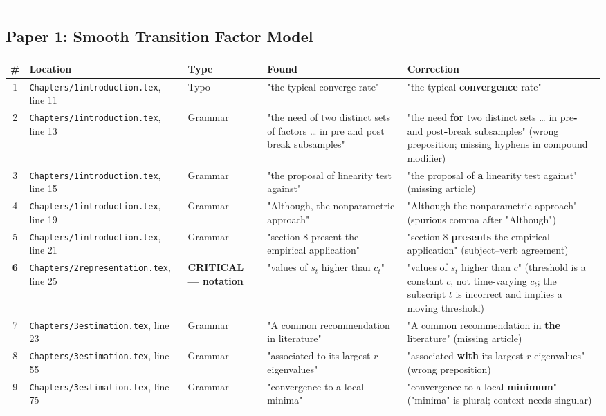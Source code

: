 \documentclass[11pt,a4paper]{article}
\begin{document}
\medskip\hrule\medskip

\subsection*{Paper 1: Smooth Transition Factor Model}

\begin{longtable}{c p{3.2cm} l p{3.8cm} p{3.5cm}}
\toprule
\textbf{\#} & \textbf{Location} & \textbf{Type} & \textbf{Found} & \textbf{Correction} \\
\midrule
\endhead
1 & \texttt{Chapters/1introduction.tex}, line 11 & Typo & "the typical converge rate" & "the typical \textbf{convergence} rate" \\
2 & \texttt{Chapters/1introduction.tex}, line 13 & Grammar & "the need of two distinct sets of factors … in pre and post break subsamples" & "the need \textbf{for} two distinct sets … in pre\textbf{-} and post\textbf{-}break subsamples" (wrong preposition; missing hyphens in compound modifier) \\
3 & \texttt{Chapters/1introduction.tex}, line 15 & Grammar & "the proposal of linearity test against" & "the proposal of \textbf{a} linearity test against" (missing article) \\
4 & \texttt{Chapters/1introduction.tex}, line 19 & Grammar & "Although, the nonparametric approach" & "Although the nonparametric approach" (spurious comma after "Although") \\
5 & \texttt{Chapters/1introduction.tex}, line 21 & Grammar & "section 8 present the empirical application" & "section 8 \textbf{presents} the empirical application" (subject–verb agreement) \\
\textbf{6} & \texttt{Chapters/2representation.tex}, line 25 & \textbf{CRITICAL — notation} & "values of $s_t$ higher than $c_t$" & "values of $s_t$ higher than $c$" (threshold is a constant $c$, not time-varying $c_t$; the subscript $t$ is incorrect and implies a moving threshold) \\
7 & \texttt{Chapters/3estimation.tex}, line 23 & Grammar & "A common recommendation in literature" & "A common recommendation in \textbf{the} literature" (missing article) \\
8 & \texttt{Chapters/3estimation.tex}, line 55 & Grammar & "associated to its largest $r$ eigenvalues" & "associated \textbf{with} its largest $r$ eigenvalues" (wrong preposition) \\
9 & \texttt{Chapters/3estimation.tex}, line 75 & Grammar & "convergence to a local minima" & "convergence to a local \textbf{minimum}" ("minima" is plural; context needs singular) \\

\end{longtable}
\end{document}
